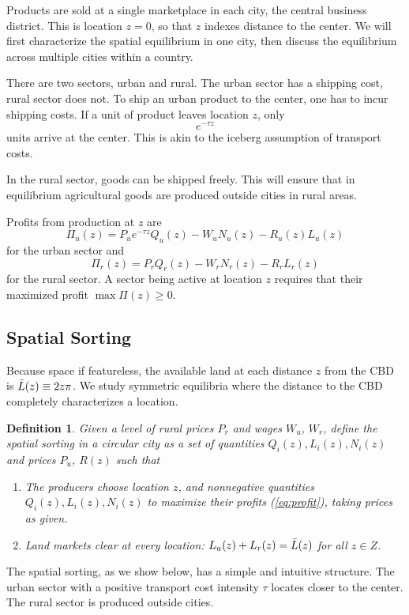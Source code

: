 \documentclass[12pt]{article}
\newtheorem{definition}{Definition}
\begin{document}
Products are sold at a single marketplace in each city, the central business district. This is location $z=0$, so that $z$ indexes distance to the center. We will first characterize the spatial equilibrium in one city, then discuss the equilibrium across multiple cities within a country.

There are two sectors, urban and rural. The urban sector has a shipping cost, rural sector does not.
To ship an urban product to the center, one has to incur shipping costs. If a unit of product leaves location $z$, only
\[
e^{-\tau z}
\]
units arrive at the center. This is akin to the iceberg assumption of transport costs.

In the rural sector, goods can be shipped freely. This will ensure that in equilibrium agricultural goods are produced outside cities in rural areas. 

Profits from production at $z$ are
\begin{equation}
\label{eq:profit}
\Pi_u(z)=P_ue^{-\tau z}Q_u(z)-W_uN_u(z)-R_u(z)L_u(z)
\end{equation}
for the urban sector and
\begin{equation}
\label{eq:profit:rural}
\Pi_r(z)=P_r Q_r(z)-W_rN_r(z)-R_rL_r(z)
\end{equation}
for the rural sector. A sector being active at location $z$ requires that their maximized profit $\max\Pi(z)\geq0$.

\subsection{Spatial Sorting}
Because space if featureless, the available land at each distance $z$ from the CBD is $\Bar L(z) \equiv 2z\pi$. We study symmetric equilibria where the distance to the CBD completely characterizes a location.

\begin{definition}
Given a level of rural prices $P_r$ and wages $W_u$, $W_r$, define the \emph{spatial sorting} in a circular city as a set of quantities $Q_i(z), L_i(z), N_i(z)$ and prices $P_u$, $R(z)$ such that
\begin{enumerate}
    \item The producers choose location $z$, and nonnegative quantities $Q_i(z), L_i(z), N_i(z)$ to maximize their profits (\ref{eq:profit}), taking prices as given.
    \item Land markets clear at every location: $L_u(z)+L_r(z)=\Bar L(z)$ for all $z\in Z$.
\end{enumerate}
\end{definition}
The spatial sorting, as we show below, has a simple and intuitive structure. The urban sector with a positive transport cost intensity $\tau$ locates closer to the center. The rural sector is produced outside cities.
\end{document}

